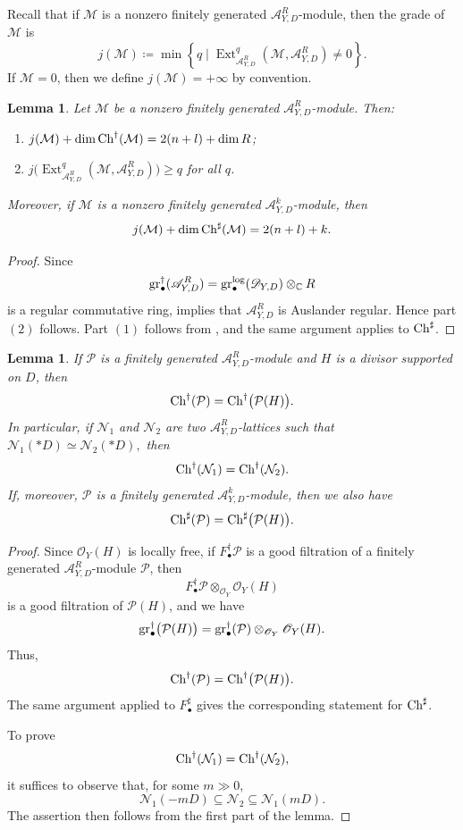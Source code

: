 \documentclass{amsart}
\theoremstyle{plain}
\numberwithin{theorem}{section}
\newtheorem{lemma}[theorem]{Lemma}
\theoremstyle{definition}
\theoremstyle{remark}
\theoremstyle{definition}
\newcommand{\C}{\mathbb{C}} %
\newcommand{\cM}{\mathcal{M}}
\newcommand{\cN}{\mathcal{N}}
\newcommand{\cO}{\mathscr{O}}
\newcommand{\cP}{\mathcal{P}}
\newcommand{\gr}{\textup{gr}}
\newcommand{\sA}{\mathscr{A}}
\newcommand{\shD}{\mathscr{D}}
\newcommand{\Ch}{\textup{Ch}}
\begin{document}
Recall that if $\cM$ is a nonzero finitely generated $\sA^R_{Y,D}$-module, then the grade of $\cM$ is
\[
j(\cM)
\coloneqq
\min\left\{
q \mid
\operatorname{Ext}^q_{\sA^R_{Y,D}}(\cM,\sA^R_{Y,D})\neq 0
\right\}.
\]
If $\cM=0$, then we define $j(\cM)=+\infty$ by convention.

\begin{lemma}\label{lm:ausdual}
Let $\cM$ be a nonzero finitely generated $\sA^R_{Y,D}$-module. Then:
\begin{enumerate}[label=$(\arabic*)$]
    \item $j(\cM)+\dim\Ch^\dagger(\cM)=2(n+l)+\dim R$;
    \item $j\big(\operatorname{Ext}^q_{\sA^R_{Y,D}}(\cM,\sA^R_{Y,D})\big)\ge q$ for all $q$.
\end{enumerate}
Moreover, if $\cM$ is a nonzero finitely generated $\sA^k_{Y,D}$-module, then
\[
j(\cM)+\dim\Ch^\sharp(\cM)=2(n+l)+k.
\]
\end{lemma}

\begin{proof}
Since
\[
\gr^\dagger_\bullet(\sA^R_{Y,D})
=
\gr^{\log}_\bullet(\shD_{Y,D})\otimes_\C R
\]
is a regular commutative ring, \cite[A.IV 4.15]{BJ} implies that $\sA^R_{Y,D}$ is Auslander regular. Hence part $(2)$ follows. Part $(1)$ follows from \cite[A.IV 4.10 and 3.5]{BJ}, and the same argument applies to $\Ch^\sharp$.
\end{proof}

\begin{lemma}\label{lm:twistCHsharp}
If $\cP$ is a finitely generated $\sA^R_{Y,D}$-module and $H$ is a divisor supported on $D$, then
\[
\Ch^\dagger(\cP)
=
\Ch^\dagger\big(\cP(H)\big).
\]
In particular, if $\cN_1$ and $\cN_2$ are two $\sA^R_{Y,D}$-lattices such that
$\cN_1(*D)\simeq \cN_2(*D),$
then
\[
\Ch^\dagger(\cN_1)=\Ch^\dagger(\cN_2).
\]
If, moreover, $\cP$ is a finitely generated $\sA^k_{Y,D}$-module, then we also have
\[
\Ch^\sharp(\cP)
=
\Ch^\sharp\big(\cP(H)\big).
\]
\end{lemma}

\begin{proof}
Since $\cO_Y(H)$ is locally free, if $F^\dagger_\bullet\cP$ is a good filtration of a finitely generated $\sA^R_{Y,D}$-module $\cP$, then
\[
F^\dagger_\bullet\cP\otimes_{\cO_Y}\cO_Y(H)
\]
is a good filtration of $\cP(H)$, and we have
\[
\gr^\dagger_\bullet\big(\cP(H)\big)
=
\gr^\dagger_\bullet(\cP)\otimes_{\cO_Y}\cO_Y(H).
\]
Thus,
\[
\Ch^\dagger(\cP)
=
\Ch^\dagger\big(\cP(H)\big).
\]
The same argument applied to $F^\sharp_\bullet$ gives the corresponding statement for $\Ch^\sharp$.

To prove
\[
\Ch^\dagger(\cN_1)=\Ch^\dagger(\cN_2),
\]
it suffices to observe that, for some $m\gg 0$,
\[
\cN_1(-mD)\subseteq \cN_2\subseteq \cN_1(mD).
\]
The assertion then follows from the first part of the lemma.
\end{proof}
\end{document}
